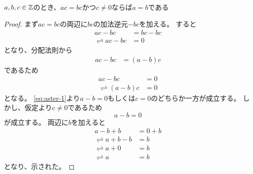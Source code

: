 \documentclass[uplatex, 11pt, a4j, dvipdfmx]{jsarticle}
\begin{document}
    \begin{screen}
      \begin{prop}
        $a, b, c \in \mathbb{Z}$のとき、$a c = b c$かつ$c \neq 0$ならば$a = b$である
      \end{prop}
    \end{screen}
    \begin{proof}
      まず$a c = b c$の両辺に$b c$の加法逆元$-bc$を加える。
      すると
      \begin{equation} \begin{aligned}
                            a c - b c &= b c - b c \\
        \rightleftharpoons  a c - b c &= 0
      \end{aligned} \end{equation}
      となり、分配法則から
      \begin{equation} \begin{aligned}
        a c - b c &= (a - b) c
      \end{aligned} \end{equation}
      であるため
      \begin{equation} \begin{aligned}
                            a c - b c &= 0 \\
        \rightleftharpoons  (a - b) c &= 0  \label{eq:aster-1}
      \end{aligned} \end{equation}
      となる。
      \cref{eq:aster-1}より$a - b = 0$もしくは$c = 0$のどちらか一方が成立する。
      しかし、仮定より$c \neq 0$であるため
      \begin{equation}
        a - b = 0
      \end{equation}
      が成立する。
      両辺に$b$を加えると
      \begin{equation} \begin{aligned}
                            a - b + b &= 0 + b \\
        \rightleftharpoons  a + b - b &= b \\
        \rightleftharpoons  a + 0 &= b \\
        \rightleftharpoons  a &= b
      \end{aligned} \end{equation}
      となり、示された。
    \end{proof}
\end{document}
